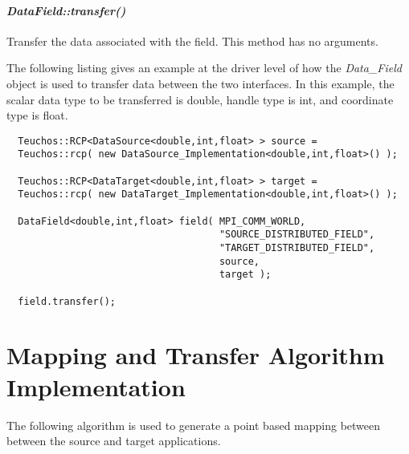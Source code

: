 \documentclass[letterpaper]{article}
\begin{document}
\paragraph{\sl DataField::transfer()}
Transfer the data associated with the field. This method has no
arguments. 

The following listing gives an example at the driver level of how the
{\sl Data\_Field} object is used to transfer data between the two
interfaces. In this example, the scalar data type to be transferred is
double, handle type is int, and coordinate type is float.

\begin{lstlisting}
  Teuchos::RCP<DataSource<double,int,float> > source = 
  Teuchos::rcp( new DataSource_Implementation<double,int,float>() );

  Teuchos::RCP<DataTarget<double,int,float> > target = 
  Teuchos::rcp( new DataTarget_Implementation<double,int,float>() );

  DataField<double,int,float> field( MPI_COMM_WORLD, 
                                     "SOURCE_DISTRIBUTED_FIELD",
                                     "TARGET_DISTRIBUTED_FIELD",
                                     source, 
                                     target ); 

  field.transfer();
\end{lstlisting}

\section{Mapping and Transfer Algorithm Implementation}
The following algorithm is used to generate a point based mapping
between between the source and target applications.
\end{document}
